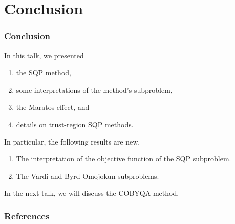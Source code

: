 \documentclass{polyu-presentation}
\begin{document}
\section{Conclusion}

\begin{frame}
    \frametitle{Conclusion}

	In this talk, we presented
    \begin{enumerate}
        \item the \alert{SQP} method,
        \item some \alert{interpretations} of the method's subproblem,
        \item the \alert{Maratos effect}, and
        \item details on \alert{trust-region SQP} methods.
    \end{enumerate}

    \bigskip

    In particular, the following results are new.
    \begin{enumerate}
        \item The \alert{interpretation} of the objective function of the SQP subproblem.
        \item The \alert{Vardi} and \alert{Byrd-Omojokun} subproblems.
    \end{enumerate}

    \bigskip

    In the next talk, we will discuss the \alert{COBYQA} method.
\end{frame}

\begin{frame}[t,allowframebreaks]
    \frametitle{References}

	\printbibliography
\end{frame}
\end{document}
